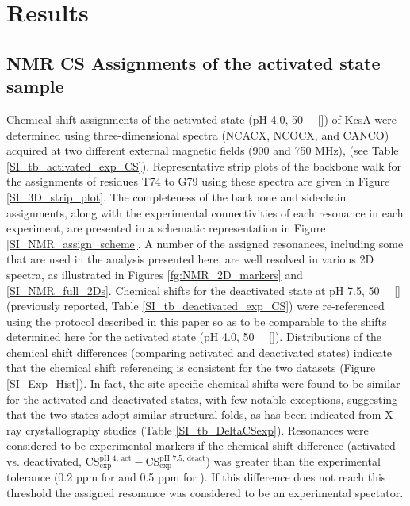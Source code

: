 \documentclass[%
 aip,
 amsmath,amssymb,
 preprint,%
]{revtex4-1}
\begin{document}
\section{Results}

\subsection{NMR CS Assignments of the activated state sample}

Chemical shift assignments of the activated state (pH 4.0, \SI{50}{\milli\molar} []) of KcsA were determined using three-dimensional spectra (NCACX, NCOCX, and CANCO) acquired at two different external magnetic fields (900 and 750 MHz),  (see Table \ref{SI_tb_activated_exp_CS}). Representative strip plots of the backbone walk for the assignments of residues T74 to G79 using these spectra are given in Figure \ref{SI_3D_strip_plot}. The completeness of the backbone and sidechain assignments, along with the experimental connectivities of each resonance in each experiment, are presented in a schematic representation in Figure \ref{SI_NMR_assign_scheme}. A number of the assigned resonances, including some that are used in the analysis presented here, are well resolved in various 2D spectra, as illustrated in Figures \ref{fg:NMR_2D_markers} and \ref{SI_NMR_full_2Ds}. Chemical shifts for the deactivated state at pH 7.5, \SI{50}{\milli\molar} []  (previously reported,\cite{Wylie2014} Table \ref{SI_tb_deactivated_exp_CS}) were re-referenced using the protocol described in this paper so as to be comparable to the shifts determined here for the activated state (pH 4.0, \SI{50}{\milli\molar} []). Distributions of the  chemical shift differences (comparing  activated and deactivated states) indicate that the chemical shift referencing is consistent for the two datasets (Figure \ref{SI_Exp_Hist}). In fact, the site-specific chemical shifts were found to be similar for the activated and deactivated states, with few notable exceptions, suggesting that the two states adopt similar structural folds, as has been indicated from X-ray crystallography studies (Table \ref{SI_tb_DeltaCSexp}). Resonances were considered to be experimental markers if the chemical shift difference (activated vs. deactivated, $\text{CS}_{\text{exp}}^{\text{pH 4, act}} - \text{CS}_{\text{exp}}^{\text{pH 7.5, deact}}$) was greater than the experimental tolerance (0.2 ppm for  and 0.5 ppm for ). If this difference does not reach this threshold the assigned resonance was considered to be an experimental spectator.
\end{document}
